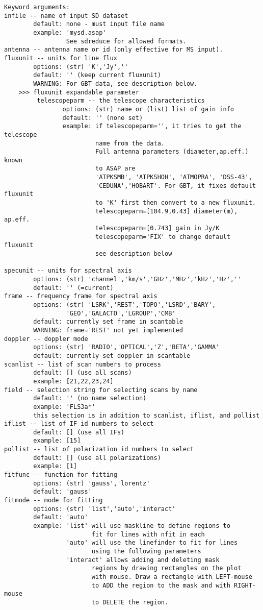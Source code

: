 \begin{verbatim}
Keyword arguments:
infile -- name of input SD dataset
        default: none - must input file name
        example: 'mysd.asap'
                 See sdreduce for allowed formats.
antenna -- antenna name or id (only effective for MS input). 
fluxunit -- units for line flux
        options: (str) 'K','Jy',''
        default: '' (keep current fluxunit)
        WARNING: For GBT data, see description below.
    >>> fluxunit expandable parameter
         telescopeparm -- the telescope characteristics
                options: (str) name or (list) list of gain info
                default: '' (none set)
                example: if telescopeparm='', it tries to get the telescope
                         name from the data.
                         Full antenna parameters (diameter,ap.eff.) known
                         to ASAP are
                         'ATPKSMB', 'ATPKSHOH', 'ATMOPRA', 'DSS-43',
                         'CEDUNA','HOBART'. For GBT, it fixes default fluxunit
                         to 'K' first then convert to a new fluxunit.
                         telescopeparm=[104.9,0.43] diameter(m), ap.eff.
                         telescopeparm=[0.743] gain in Jy/K
                         telescopeparm='FIX' to change default fluxunit
                         see description below

specunit -- units for spectral axis
        options: (str) 'channel','km/s','GHz','MHz','kHz','Hz',''
        default: '' (=current)
frame -- frequency frame for spectral axis
        options: (str) 'LSRK','REST','TOPO','LSRD','BARY',
                 'GEO','GALACTO','LGROUP','CMB'
        default: currently set frame in scantable
        WARNING: frame='REST' not yet implemented
doppler -- doppler mode
        options: (str) 'RADIO','OPTICAL','Z','BETA','GAMMA'
        default: currently set doppler in scantable
scanlist -- list of scan numbers to process
        default: [] (use all scans)
        example: [21,22,23,24]
field -- selection string for selecting scans by name
        default: '' (no name selection)
        example: 'FLS3a*'
        this selection is in addition to scanlist, iflist, and pollist
iflist -- list of IF id numbers to select
        default: [] (use all IFs)
        example: [15]
pollist -- list of polarization id numbers to select
        default: [] (use all polarizations)
        example: [1]
fitfunc -- function for fitting
        options: (str) 'gauss','lorentz'
        default: 'gauss'
fitmode -- mode for fitting
        options: (str) 'list','auto','interact'
        default: 'auto'
        example: 'list' will use maskline to define regions to
                        fit for lines with nfit in each
                 'auto' will use the linefinder to fit for lines
                        using the following parameters
                 'interact' allows adding and deleting mask 
                        regions by drawing rectangles on the plot 
                        with mouse. Draw a rectangle with LEFT-mouse 
                        to ADD the region to the mask and with RIGHT-mouse 
                        to DELETE the region. 


\end{verbatim}
